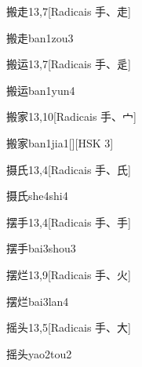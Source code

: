 \begin{entry}{搬走}{13,7}[Radicais ⼿、⾛]
  \begin{phonetics}{搬走}{ban1zou3}
  \end{phonetics}
\end{entry}

\begin{entry}{搬运}{13,7}[Radicais ⼿、⾡]
  \begin{phonetics}{搬运}{ban1yun4}
  \end{phonetics}
\end{entry}

\begin{entry}{搬家}{13,10}[Radicais ⼿、⼧]
  \begin{phonetics}{搬家}{ban1jia1}[][HSK 3]
  \end{phonetics}
\end{entry}

\begin{entry}{摄氏}{13,4}[Radicais ⼿、⽒]
  \begin{phonetics}{摄氏}{she4shi4}
  \end{phonetics}
\end{entry}

\begin{entry}{摆手}{13,4}[Radicais ⼿、⼿]
  \begin{phonetics}{摆手}{bai3shou3}
  \end{phonetics}
\end{entry}

\begin{entry}{摆烂}{13,9}[Radicais ⼿、⽕]
  \begin{phonetics}{摆烂}{bai3lan4}
  \end{phonetics}
\end{entry}

\begin{entry}{摇头}{13,5}[Radicais ⼿、⼤]
  \begin{phonetics}{摇头}{yao2tou2}
  \end{phonetics}
\end{entry}

